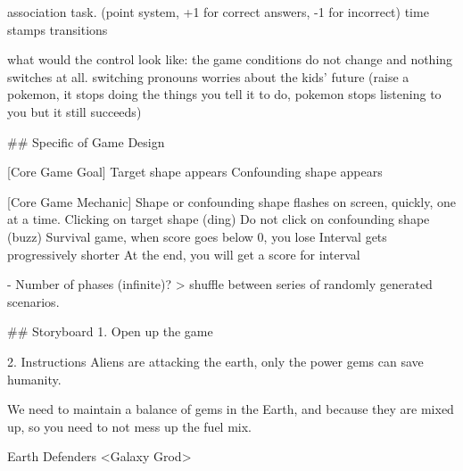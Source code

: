 association task. (point system, +1 for correct answers, -1 for incorrect)
time stamps
transitions 

what would the control look like: the game conditions do not change and nothing switches at all. 
switching pronouns
worries about the kids' future (raise a pokemon, it stops doing the things you tell it to do, pokemon stops listening to you but it still succeeds)

## Specific of Game Design

[Core Game Goal]
Target shape appears
Confounding shape appears

[Core Game Mechanic]
Shape or confounding shape flashes on screen, quickly, one at a time.
Clicking on target shape (ding)
Do not click on confounding shape (buzz)
Survival game, when score goes below 0, you lose
Interval gets progressively shorter
At the end, you will get a score for interval

- Number of phases (infinite)?
    > shuffle between series of randomly generated scenarios.

## Storyboard
1. Open up the game

2. Instructions
{}
    Aliens are attacking the earth, only the power gems can save humanity.
    
    We need to maintain a balance of gems in the Earth, and because they are mixed up, so you need to not mess up the fuel mix.
    
    Earth Defenders <Galaxy Grod>
{}


